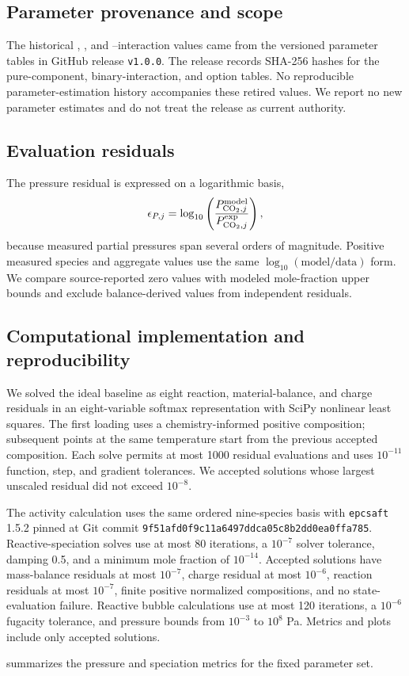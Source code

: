\subsection{Parameter provenance and scope}
The historical \MEAH, \MEACOO, and \MEAH--\MEACOO interaction values came from the versioned parameter tables in GitHub release \texttt{v1.0.0}.  The release records SHA-256 hashes for the pure-component, binary-interaction, and option tables.  No reproducible parameter-estimation history accompanies these retired values.  We report no new parameter estimates and do not treat the release as current authority.

\subsection{Evaluation residuals}
The pressure residual is expressed on a logarithmic basis,
\begin{equation}
    \epsilon_{P,j}
    =
    \log_{10}\left(\frac{P_{\COtwo,j}^{\mathrm{model}}}{P_{\COtwo,j}^{\mathrm{exp}}}\right),
    \label{eq:pressure-log-residual}
\end{equation}
because measured \COtwo partial pressures span several orders of magnitude.  Positive measured species and aggregate values use the same \(\log_{10}(\mathrm{model}/\mathrm{data})\) form.  We compare source-reported zero values with modeled mole-fraction upper bounds and exclude balance-derived values from independent residuals.

\subsection{Computational implementation and reproducibility}
We solved the ideal baseline as eight reaction, material-balance, and charge residuals in an eight-variable softmax representation with SciPy nonlinear least squares.  The first loading uses a chemistry-informed positive composition; subsequent points at the same temperature start from the previous accepted composition.  Each solve permits at most 1000 residual evaluations and uses \(10^{-11}\) function, step, and gradient tolerances.  We accepted solutions whose largest unscaled residual did not exceed \(10^{-8}\).

The activity calculation uses the same ordered nine-species basis with \texttt{epcsaft} 1.5.2 pinned at Git commit \texttt{9f51afd0f9c11a6497ddca05c8b2dd0ea0ffa785}.  Reactive-speciation solves use at most 80 iterations, a \(10^{-7}\) solver tolerance, damping 0.5, and a minimum mole fraction of \(10^{-14}\).  Accepted solutions have mass-balance residuals at most \(10^{-7}\), charge residual at most \(10^{-6}\), reaction residuals at most \(10^{-7}\), finite positive normalized compositions, and no state-evaluation failure.  Reactive bubble calculations use at most 120 iterations, a \(10^{-6}\) fugacity tolerance, and pressure bounds from \(10^{-3}\) to \(10^{8}\) Pa.  Metrics and plots include only accepted solutions.

 summarizes the pressure and speciation metrics for the fixed parameter set.


